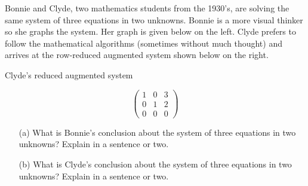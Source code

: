\begin{problem}
    Bonnie and Clyde, two mathematics students from the
    1930's, are solving the same system of three equations in two unknowns.  Bonnie is a more
    visual thinker so she graphs the system.  Her graph is given below on the left.  Clyde
    prefers to follow the mathematical algorithms (sometimes without much thought) and
    arrives at the row-reduced augmented system shown below on the right.  

    \begin{minipage}{0.5\columnwidth}
        \begin{center}
        \end{center}
    \end{minipage}
    \begin{minipage}{0.5\columnwidth}
        \begin{center}
            Clyde's reduced augmented system 
        \end{center}
        \[ \left( \begin{array}{cc|c} 1 & 0 & 3 \\ 0 & 1 & 2 \\ 0 & 0 & 0 \end{array} \right) \]
    \end{minipage}

    \begin{enumerate}
        \item[(a)] What is Bonnie's conclusion about the system of three equations in two
        unknowns?  Explain in a sentence or two.

    \item[(b)] What is Clyde's conclusion about the system of three equations in two
        unknowns?  Explain in a sentence or two.


\end{enumerate}
\end{problem}
